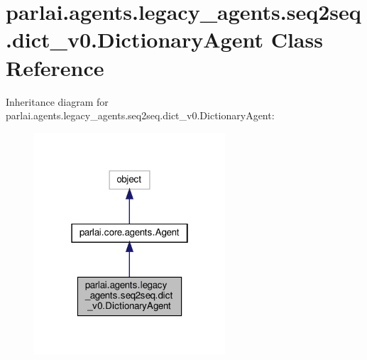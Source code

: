 \hypertarget{classparlai_1_1agents_1_1legacy__agents_1_1seq2seq_1_1dict__v0_1_1DictionaryAgent}{}\section{parlai.\+agents.\+legacy\+\_\+agents.\+seq2seq.\+dict\+\_\+v0.\+Dictionary\+Agent Class Reference}
\label{classparlai_1_1agents_1_1legacy__agents_1_1seq2seq_1_1dict__v0_1_1DictionaryAgent}


Inheritance diagram for parlai.\+agents.\+legacy\+\_\+agents.\+seq2seq.\+dict\+\_\+v0.\+Dictionary\+Agent\+:
\nopagebreak
\begin{figure}[H]
\begin{center}
\leavevmode
\includegraphics[width=202pt]{classparlai_1_1agents_1_1legacy__agents_1_1seq2seq_1_1dict__v0_1_1DictionaryAgent__inherit__graph}
\end{center}
\end{figure}


